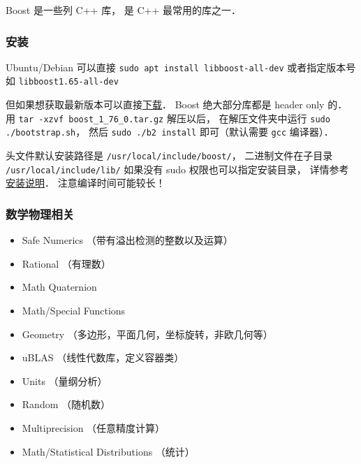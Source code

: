 
Boost 是一些列 C++ 库， 是 C++ 最常用的库之一．

\subsubsection{安装}
Ubuntu/Debian 可以直接 \verb|sudo apt install libboost-all-dev| 或者指定版本号如 \verb|libboost1.65-all-dev|

但如果想获取最新版本可以直接\href{https://www.boost.org/users/history/version_1_76_0.html}{下载}． Boost 绝大部分库都是 header only 的． 用 \verb|tar -xzvf boost_1_76_0.tar.gz| 解压以后， 在解压文件夹中运行 \verb|sudo ./bootstrap.sh|， 然后 \verb|sudo ./b2 install| 即可（默认需要 \verb|gcc| 编译器）．

头文件默认安装路径是 \verb|/usr/local/include/boost/|， 二进制文件在子目录 \verb|/usr/local/include/lib/| 如果没有 sudo 权限也可以指定安装目录， 详情参考\href{https://www.boost.org/doc/libs/1_76_0/more/getting_started/unix-variants.html#easy-build-and-install}{安装说明}． 注意编译时间可能较长！

\subsubsection{数学物理相关}
\begin{itemize}
\item Safe Numerics （带有溢出检测的整数以及运算）
\item Rational （有理数）
\item Math Quaternion
\item Math/Special Functions
\item Geometry （多边形，平面几何，坐标旋转，非欧几何等）
\item uBLAS （线性代数库，定义容器类）
\item Units （量纲分析）
\item Random （随机数）
\item Multiprecision （任意精度计算）
\item Math/Statistical Distributions （统计）
\end{itemize}

